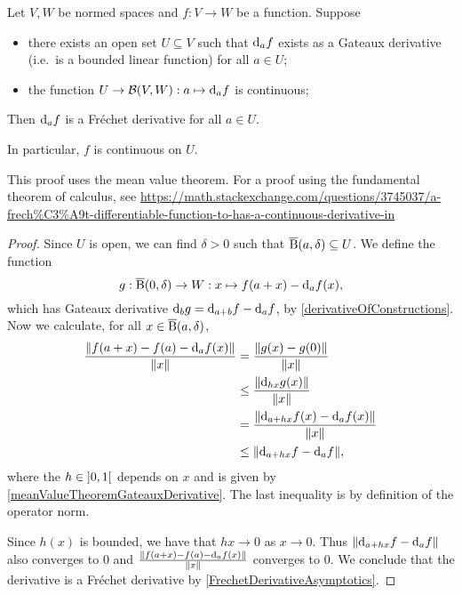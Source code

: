 \begin{proposition}
Let $V,W$ be normed spaces and $f: V\to W$ be a function. Suppose
\begin{itemize}
\item there exists an open set $U\subseteq V$ such that $\operatorname{d \!}{_af}$ exists as a Gateaux derivative (i.e.\ is a bounded linear function) for all $a\in U$;
\item the function $U \to \operatorname{\mathcal{B}}(V,W): a\mapsto \operatorname{d \!}{_af}$ is continuous;
\end{itemize}
Then $\operatorname{d \!}{_af}$ is a Fréchet derivative for all $a\in U$.
\end{proposition}
In particular, $f$ is continuous on $U$.

This proof uses the mean value theorem. For a proof using the fundamental theorem of calculus, see 
\url{https://math.stackexchange.com/questions/3745037/a-frech%C3%A9t-differentiable-function-to-has-a-continuous-derivative-in}
\begin{proof}
Since $U$ is open, we can find $\delta >0$ such that $\operatorname{\overline{B}}(a, \delta) \subseteq U$. We define the function
\[ g: \operatorname{\overline{B}}(0, \delta) \to W: x\mapsto f(a+x) - \operatorname{d \!}{_af}(x), \]
which has Gateaux derivative $\operatorname{d \!}{_bg} = \operatorname{d \!}{_{a+b}f} - \operatorname{d \!}{_af}$, by \ref{derivativeOfConstructions}. Now we calculate, for all $x\in \operatorname{\overline{B}}(a,\delta)$,
\begin{align*}
\frac{\lVert f(a+x) - f(a) - \operatorname{d \!}{_af}(x)\rVert}{\lVert x\rVert} &= \frac{\lVert g(x) - g(0)\rVert}{\lVert x\rVert} \\
&\leq \frac{\lVert\operatorname{d \!}{_{hx}g}(x)\rVert}{\lVert x\rVert} \\
&= \frac{\lVert\operatorname{d \!}{_{a+hx}f}(x) - \operatorname{d \!}{_af}(x)\rVert}{\lVert x\rVert} \\
&\leq \lVert\operatorname{d \!}{_{a+hx}f} - \operatorname{d \!}{_af}\rVert,
\end{align*}
where the $h \in \interval[o]{0,1}$ depends on $x$ and is given by \ref{meanValueTheoremGateauxDerivative}. The last inequality is by definition of the operator norm.

Since $h(x)$ is bounded, we have that $hx \to 0$ as $x\to 0$. Thus $\lVert\operatorname{d \!}{_{a+hx}f} - \operatorname{d \!}{_af}\rVert$ also converges to $0$ and $\frac{\lVert f(a+x) - f(a) - \operatorname{d \!}{_af}(x)\rVert}{\lVert x\rVert}$ converges to $0$. We conclude that the derivative is a Fréchet derivative by \ref{FrechetDerivativeAsymptotics}.
\end{proof}

